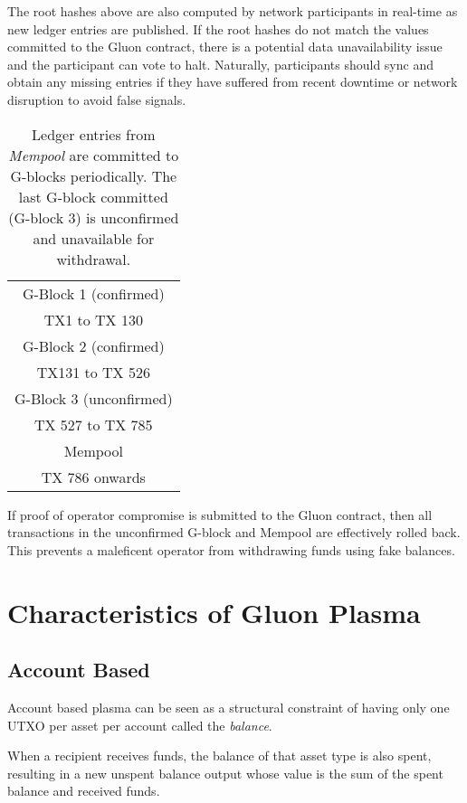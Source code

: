 \documentclass[12pt,a4paper]{article}
\begin{document}
The root hashes above are also computed by network participants in real-time as new ledger entries are published. If the root hashes do not match the values committed to the Gluon contract, there is a potential data unavailability issue and the participant can vote to halt. Naturally, participants should sync and obtain any missing entries if they have suffered from recent downtime or network disruption to avoid false signals.

\begin{table}[ht]
\caption{Ledger entries from \emph{Mempool} are committed to G-blocks periodically. The last G-block committed (G-block 3) is unconfirmed and unavailable for withdrawal.}
\centering
\begin{tabular}{|c|}
\hline
\rowcolor{green!50}G-Block 1 (confirmed) \\
\rowcolor{green!30}TX1 to TX 130 \\
\hline
\rowcolor{green!50}G-Block 2 (confirmed) \\
\rowcolor{green!30}TX131 to TX 526 \\
\hline
\rowcolor{orange!50}G-Block 3 (unconfirmed) \\
\rowcolor{orange!30}TX 527 to TX 785 \\
\hline
Mempool \\
TX 786 onwards \\
\hline
\end{tabular}
\end{table}

If proof of operator compromise is submitted to the Gluon contract, then all transactions in the unconfirmed G-block and Mempool are effectively rolled back. This prevents a maleficent operator from withdrawing funds using fake balances.

\section{Characteristics of Gluon Plasma}
\subsection{Account Based}
Account based plasma can be seen as a structural constraint of having only one UTXO per asset per account called the \emph{balance}.

When a recipient receives funds, the balance of that asset type is also spent, resulting in a new unspent balance output whose value is the sum of the spent balance and received funds.
\end{document}

